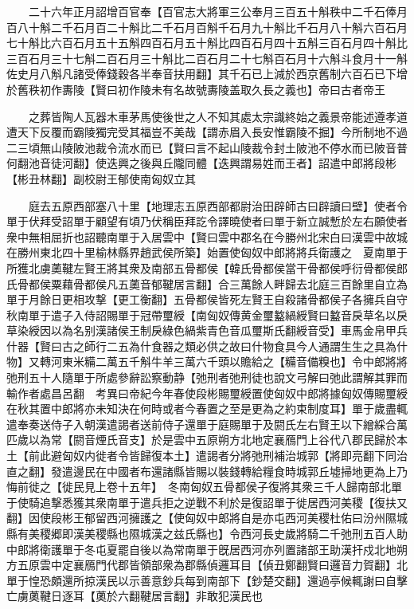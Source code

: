 　　二十六年正月詔增百官奉【百官志大將軍三公奉月三百五十斛秩中二千石俸月百八十斛二千石月百二十斛比二千石月百斛千石月九十斛比千石月八十斛六百石月七十斛比六百石月五十五斛四百石月五十斛比四百石月四十五斛三百石月四十斛比三百石月三十七斛二百石月三十斛比二百石月二十七斛百石月十六斛斗食月十一斛佐史月八斛凡諸受俸錢穀各半奉音扶用翻】其千石已上減於西京舊制六百石已下增於舊秩初作夀陵【賢曰初作陵未有名故號夀陵盖取久長之義也】帝曰古者帝王

　　之葬皆陶人瓦器木車茅馬使後世之人不知其處太宗識終始之義景帝能述遵孝道遭天下反覆而霸陵獨完受其福豈不美哉【謂赤眉入長安惟霸陵不掘】今所制地不過二三頃無山陵陂池裁令流水而已【賢曰言不起山陵裁令封土陂池不停水而已陂音普何翻池音徒河翻】使迭興之後與丘隴同體【迭興謂易姓而王者】詔遣中郎將段彬【彬丑林翻】副校尉王郁使南匈奴立其

　　庭去五原西部塞八十里【地理志五原西部都尉治田辟師古曰辟讀曰壁】使者令單于伏拜受詔單于顧望有頃乃伏稱臣拜訖令譯曉使者曰單于新立誠慙於左右願使者衆中無相屈折也詔聽南單于入居雲中【賢曰雲中郡名在今勝州北宋白曰漢雲中故城在勝州東北四十里榆林縣界趙武侯所築】始置使匈奴中郎將將兵衛護之　夏南單于所獲北虜薁鞬左賢王將其衆及南部五骨都侯【韓氏骨都侯當干骨都侯呼衍骨都侯郎氏骨都侯粟藉骨都侯凡五薁音郁鞬居言翻】合三萬餘人畔歸去北庭三百餘里自立為單于月餘日更相攻撃【更工衡翻】五骨都侯皆死左賢王自殺諸骨都侯子各擁兵自守　秋南單于遣子入侍詔賜單于冠帶璽綬【南匈奴傳黄金璽盭緺綬賢曰盭音戾草名以戾草染綬因以為名别漢諸侯王制戾綠色緺紫青色音瓜璽斯氏翻綬音受】車馬金帛甲兵什器【賢曰古之師行二五為什食器之類必供之故曰什物食具今人通謂生生之具為什物】又轉河東米糒二萬五千斛牛羊三萬六千頭以贍給之【糒音備糗也】令中郎將將弛刑五十人隨單于所處參辭訟察動静【弛刑者弛刑徒也說文弓解曰弛此謂解其罪而輸作者處昌呂翻　考異曰帝紀今年春使段彬賜璽綬置使匈奴中郎將據匈奴傳賜璽綬在秋其置中郎將亦未知決在何時或者今春置之至是更為之約束制度耳】單于歲盡輒遣奉奏送侍子入朝漢遣謁者送前侍子還單于庭賜單于及閼氏左右賢王以下繒綵合萬匹歲以為常【閼音煙氏音支】於是雲中五原朔方北地定襄鴈門上谷代八郡民歸於本土【前此避匈奴内徙者令皆歸復本土】遣謁者分將弛刑補治城郭【將即亮翻下同治直之翻】發遣邊民在中國者布還諸縣皆賜以裝錢轉給糧食時城郭丘墟掃地更為上乃悔前徙之【徙民見上卷十五年】　冬南匈奴五骨都侯子復將其衆三千人歸南部北單于使騎追撃悉獲其衆南單于遣兵拒之逆戰不利於是復詔單于徙居西河美稷【復扶又翻】因使段彬王郁留西河擁護之【使匈奴中郎將自是亦屯西河美稷杜佑曰汾州隰城縣有美稷郷即漢美稷縣也隰城漢之兹氏縣也】令西河長史歲將騎二千弛刑五百人助中郎將衛護單于冬屯夏罷自後以為常南單于旣居西河亦列置諸部王助漢扞戍北地朔方五原雲中定襄鴈門代郡皆領部衆為郡縣偵邏耳目【偵丑鄭翻賢曰邏音力賀翻】北單于惶恐頗還所掠漢民以示善意鈔兵每到南部下【鈔楚交翻】還過亭候輒謝曰自擊亡虜薁鞬日逐耳【薁於六翻鞬居言翻】非敢犯漢民也

